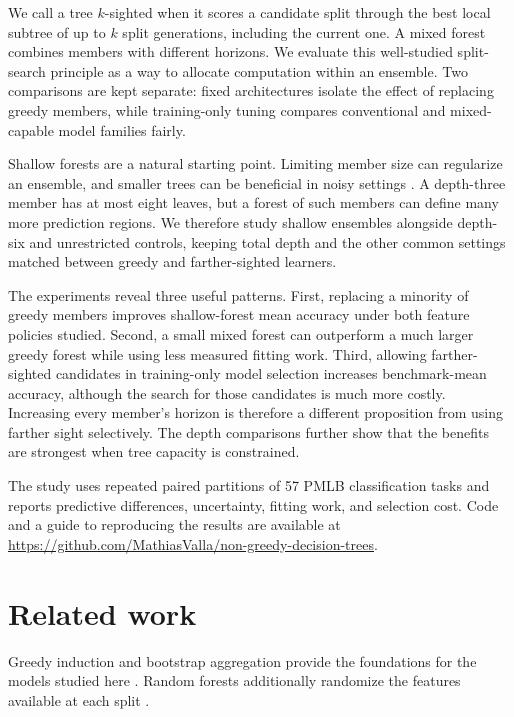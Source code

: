 \documentclass[final,5p,times]{elsarticle}
\begin{document}
We call a tree $k$-sighted when it scores a candidate split through the best local subtree of up to $k$ split generations, including the current one. A mixed forest combines members with different horizons. We evaluate this well-studied split-search principle as a way to allocate computation within an ensemble. Two comparisons are kept separate: fixed architectures isolate the effect of replacing greedy members, while training-only tuning compares conventional and mixed-capable model families fairly.

Shallow forests are a natural starting point. Limiting member size can regularize an ensemble, and smaller trees can be beneficial in noisy settings \cite{zhou2023trees,duroux2018impact}. A depth-three member has at most eight leaves, but a forest of such members can define many more prediction regions. We therefore study shallow ensembles alongside depth-six and unrestricted controls, keeping total depth and the other common settings matched between greedy and farther-sighted learners.

The experiments reveal three useful patterns. First, replacing a minority of greedy members improves shallow-forest mean accuracy under both feature policies studied. Second, a small mixed forest can outperform a much larger greedy forest while using less measured fitting work. Third, allowing farther-sighted candidates in training-only model selection increases benchmark-mean accuracy, although the search for those candidates is much more costly. Increasing every member's horizon is therefore a different proposition from using farther sight selectively. The depth comparisons further show that the benefits are strongest when tree capacity is constrained.

The study uses repeated paired partitions of 57 PMLB classification tasks and reports predictive differences, uncertainty, fitting work, and selection cost. Code and a guide to reproducing the results are available at \url{https://github.com/MathiasValla/non-greedy-decision-trees}.

\section{Related work}
Greedy induction and bootstrap aggregation provide the foundations for the models studied here \cite{breiman1984cart,quinlan1986induction,breiman1996bagging}. Random forests additionally randomize the features available at each split \cite{breiman2001random}.
\end{document}
